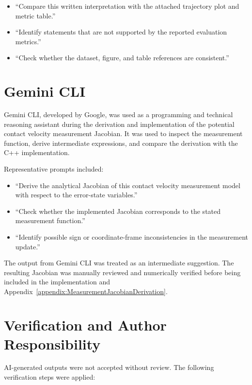 \documentclass[report.tex]{subfiles}
\begin{document}
\begin{itemize}
    \item ``Compare this written interpretation with the attached trajectory plot and metric table.''
    \item ``Identify statements that are not supported by the reported evaluation metrics.''
    \item ``Check whether the dataset, figure, and table references are consistent.''
\end{itemize}

\section{Gemini CLI}

Gemini CLI, developed by Google, was used as a programming and technical reasoning assistant during the derivation and implementation of the potential contact velocity measurement Jacobian. It was used to inspect the measurement function, derive intermediate expressions, and compare the derivation with the C++ implementation.

Representative prompts included:

\begin{itemize}
    \item ``Derive the analytical Jacobian of this contact velocity measurement model with respect to the error-state variables.''
    \item ``Check whether the implemented Jacobian corresponds to the stated measurement function.''
    \item ``Identify possible sign or coordinate-frame inconsistencies in the measurement update.''
\end{itemize}

The output from Gemini CLI was treated as an intermediate suggestion. The resulting Jacobian was manually reviewed and numerically verified before being included in the implementation and Appendix~\ref{appendix:MeasurementJacobianDerivation}.

\section{Verification and Author Responsibility}

AI-generated outputs were not accepted without review. The following verification steps were applied:
\end{document}
